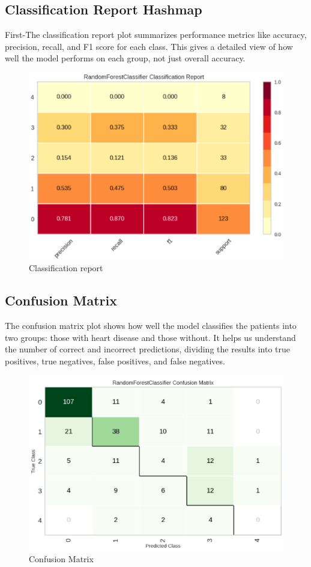 \documentclass[journal]{IEEEtran}
\begin{document}
\subsection{Classification Report Hashmap}
First-The classification report plot summarizes performance metrics like accuracy, precision, recall, and F1 score for each class. This gives a detailed view of how well the model performs on each group, not just overall accuracy.
\begin{figure}[h]
    \centering
    \includegraphics[width=1\linewidth]{images/Classification Report Heatmap.png}
    \caption{Classification report}
    \label{fig:feature-importance}
\end{figure} 

\subsection{Confusion Matrix}
The confusion matrix plot shows how well the model classifies the patients into two groups: those with heart disease and those without. It helps us understand the number of correct and incorrect predictions, dividing the results into true positives, true negatives, false positives, and false negatives.
\begin{figure}[h]
    \centering
    \includegraphics[width=1\linewidth]{images/Confusion Matrix.png}
    \caption{Confusion Matrix}
    \label{fig:confusion-matrix}
\end{figure}
\end{document}
